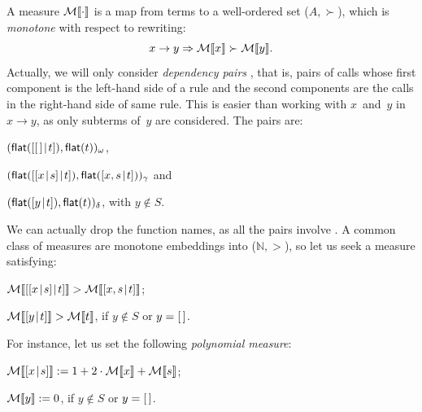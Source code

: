 A measure \(\mathcal{M}\llbracket{\cdot}\rrbracket\) is a map from terms to a
well\hyp{}ordered set (\(A,\succ\)), which is \emph{monotone} with
respect to rewriting:
\begin{equation*}
  x \rightarrow y \Rightarrow \mathcal{M}\llbracket{x}\rrbracket \succ \mathcal{M}\llbracket{y}\rrbracket.
\end{equation*}
Actually, we will only consider \emph{dependency pairs}
\citep{ArtsGiesl_2000}, that is,
pairs of calls whose first component is the left\hyp{}hand side of a
rule and the second components are the calls in the right\hyp{}hand
side of same rule. This is easier than working with \(x\)~and~\(y\) in
\(x \rightarrow y\), as only subterms of~\(y\) are considered. The
pairs are:
\begin{itemize*}

  \item \((\textsf{flat}([{[\,]}\!\mid\!{t}]),
    \textsf{flat}(t))_\omega\),

  \item \((\textsf{flat}([{[{x}\!\mid\!{s}]}\!\mid\!{t}]),
    \textsf{flat}([{x,s}\!\mid\!{t}]))_\gamma\) and

  \item \((\textsf{flat}([{y}\!\mid\!{t}]), \textsf{flat}(t))_\delta\), with \(y
    \not\in S\).
\end{itemize*}
We can actually drop the function names, as all the pairs involve
. A common class of measures are
monotone embeddings into (\(\mathbb{N},>\)), so let us seek a measure
satisfying:
\begin{itemize*}

  \item \(\mathcal{M}\llbracket{[{[{x}\!\mid\!{s}]}\!\mid\!{t}]}\rrbracket > \mathcal{M}\llbracket{[{x,s}\!\mid\!{t}]}\rrbracket\);

  \item \(\mathcal{M}\llbracket{[{y}\!\mid\!{t}]}\rrbracket > \mathcal{M}\llbracket{t}\rrbracket\), if \(y \not\in S\) or
    \(y=[\,]\).

\end{itemize*}
For instance, let us set the following \emph{polynomial
  measure}:
\begin{itemize*}

  \item \(\mathcal{M}\llbracket{[{x}\!\mid\!{s}]}\rrbracket := 1 + 2\cdot\mathcal{M}\llbracket{x}\rrbracket +
    \mathcal{M}\llbracket{s}\rrbracket\);

  \item \(\mathcal{M}\llbracket{y}\rrbracket := 0\), if \(y \not\in S\) or \(y=[\,]\).

\end{itemize*}
